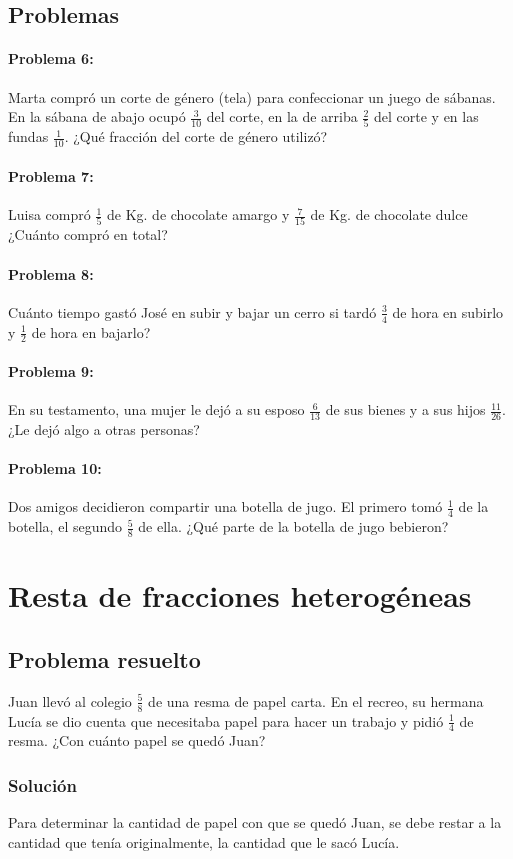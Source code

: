 \documentclass[10pt,twoside]{article}
\begin{document}
\subsection*{Problemas}
\paragraph*{Problema 6:} Marta compró un corte de género (tela) para confeccionar un juego de sábanas. En la sábana de abajo ocupó $\frac{3}{10}$ del corte, en la de arriba $\frac{2}{5}$ del corte y en las fundas $\frac{1}{10}$. ¿Qué fracción del corte de género utilizó?
\paragraph*{Problema 7:} Luisa compró $\frac{1}{5}$ de Kg. de chocolate amargo y $\frac{7}{15}$ de Kg. de chocolate dulce ¿Cuánto compró en total?
\paragraph*{Problema 8:} Cuánto tiempo gastó José en subir y bajar un cerro si tardó $\frac{3}{4}$ de hora en subirlo y $\frac{1}{2}$ de hora en bajarlo?
\paragraph*{Problema 9:} En su testamento, una mujer le dejó a su esposo $\frac{6}{13}$ de sus bienes y a sus hijos $\frac{11}{26}$. ¿Le dejó algo a otras personas?
\paragraph*{Problema 10:} Dos amigos decidieron compartir una botella de jugo. El primero tomó $\frac{1}{4}$ de la botella, el segundo $\frac{5}{8}$ de ella. ¿Qué parte de la botella de jugo bebieron?
\section*{Resta de fracciones heterog\'{e}neas}
\subsection*{Problema resuelto}
Juan llevó al colegio $\frac{5}{8}$ de una resma de 
 papel carta. En el recreo, su hermana Lucía se dio cuenta que necesitaba papel para hacer un trabajo y pidió $\frac{1}{4}$ de resma. ¿Con cuánto papel se quedó Juan? 
\subsubsection*{Soluci\'{o}n}
Para determinar la cantidad de papel con que se quedó Juan, se debe restar a la cantidad que tenía originalmente, la cantidad que le sacó Lucía.\\
\end{document}
